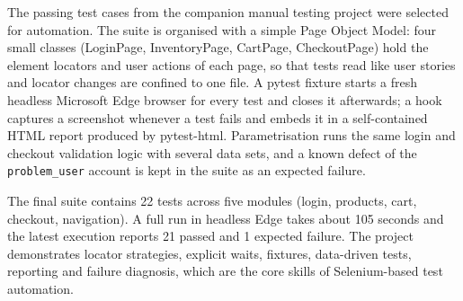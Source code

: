 \documentclass[12pt,a4paper]{article}
\begin{document}
The passing test cases from the companion manual testing project were selected for automation. The suite is organised with a simple Page Object Model: four small classes (LoginPage, InventoryPage, CartPage, CheckoutPage) hold the element locators and user actions of each page, so that tests read like user stories and locator changes are confined to one file. A pytest fixture starts a fresh headless Microsoft Edge browser for every test and closes it afterwards; a hook captures a screenshot whenever a test fails and embeds it in a self-contained HTML report produced by pytest-html. Parametrisation runs the same login and checkout validation logic with several data sets, and a known defect of the \texttt{problem\_user} account is kept in the suite as an expected failure.

The final suite contains 22 tests across five modules (login, products, cart, checkout, navigation). A full run in headless Edge takes about 105 seconds and the latest execution reports 21 passed and 1 expected failure. The project demonstrates locator strategies, explicit waits, fixtures, data-driven tests, reporting and failure diagnosis, which are the core skills of Selenium-based test automation.
\newpage
\end{document}
